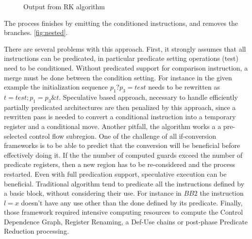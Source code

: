 \begin{figure}
\footnotesize
\caption{Output from RK algorithm}
\label{fig:RK}
\end{figure}

The process finishes by emitting the conditioned instructions, and removes the branches. \ref{fig:nested}. 

There are several problems with this approach. First, it strongly assumes that all instructions can be predicated, in particular predicate setting operations (test) need to be conditioned. Without predicated support for comparison instruction, a merge must be done between the condition setting. For instance in the given example the initialization sequence $p_1 ? p_3=test$ needs to be rewritten as $t=test; p_1=p_3 \& t$. Speculative based approach, necessary to handle efficiently partially predicated architectures are then penalized by this approach, since a rewritten pass is needed to convert a conditional instruction into a temporary register and a conditional move.
Another pitfall, the algorithm works a a pre-selected control flow subregion. One of the challenge of all if-conversion frameworks is to be able to predict that the conversion will be beneficial before effectively doing it. If the  the number of computed guards exceed the number of predicate registers, then a new region has to be re-considered and the process restarted. Even with full predication support, speculative execution can be beneficial. Traditional algorithm tend to predicate all the instructions defined by a basic block, without considering their use. For instance in $BB2$ the instruction $l=x$ doesn't have any use other than the done defined by its predicate. Finally, those framework required intensive computing resources to compute the Control Dependence Graph, Register Renaming, a Def-Use chains or post-phase Predicate Reduction processing.

